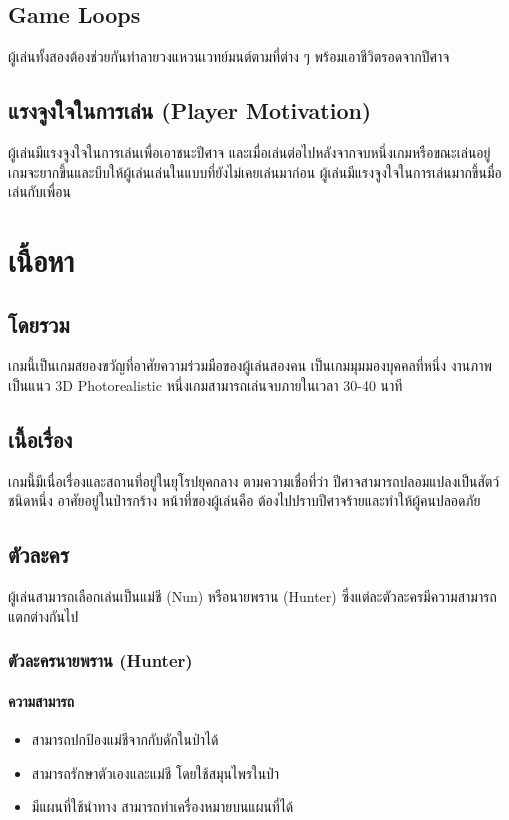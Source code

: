 \subsection{Game Loops}

ผู้เล่นทั้งสองต้องช่วยกันทำลายวงแหวนเวทย์มนต์ตามที่ต่าง ๆ พร้อมเอาชีวิตรอดจากปีศาจ

\subsection{แรงจูงใจในการเล่น (Player Motivation)}

ผู้เล่นมีแรงจูงใจในการเล่นเพื่อเอาชนะปีศาจ และเมื่อเล่นต่อไปหลังจากจบหนึ่งเกมหรือขณะเล่นอยู่ เกมจะยากขึ้นและบีบให้ผู้เล่นเล่นในแบบที่ยังไม่เคยเล่นมาก่อน ผู้เล่นมีแรงจูงใจในการเล่นมากขึ้นมื่อเล่นกับเพื่อน

\section{เนื้อหา}

\subsection{โดยรวม}

เกมนี้เป็นเกมสยองขวัญที่อาศัยความร่วมมือของผู้เล่นสองคน เป็นเกมมุมมองบุคคลที่หนึ่ง งานภาพเป็นแนว 3D Photorealistic หนึ่งเกมสามารถเล่นจบภายในเวลา 30-40 นาที

\subsection{เนื้อเรื่อง}

เกมนี้มีเนื่อเรื่องและสถานที่อยู่ในยุโรปยุคกลาง ตามความเชื่อที่ว่า ปีศาจสามารถปลอมแปลงเป็นสัตว์ชนิดหนึ่ง อาศัยอยู่ในป่ารกร้าง หน้าที่ของผู้เล่นคือ ต้องไปปราบปีศาจร้ายและทำให้ผู้คนปลอดภัย

\subsection{ตัวละคร}

ผู้เล่นสามารถเลือกเล่นเป็นแม่ชี (Nun) หรือนายพราน (Hunter) ซึ่งแต่ละตัวละครมีความสามารถแตกต่างกันไป

\subsubsection{ตัวละครนายพราน (Hunter)}

\paragraph{ความสามารถ}
\begin{itemize}
  \item สามารถปกป้องแม่ชีจากกับดักในป่าได้
  \item สามารถรักษาตัวเองและแม่ชี โดยใช้สมุนไพรในป่า
  \item มีแผนที่ใช้นำทาง สามารถทำเครื่องหมายบนแผนที่ได้
\end{itemize}

